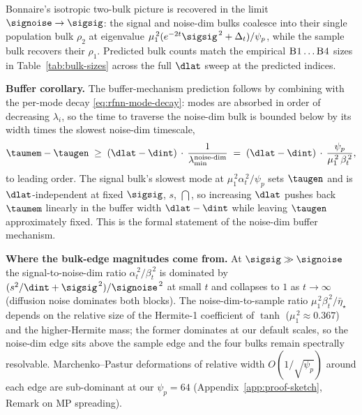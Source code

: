 Bonnaire's isotropic two-bulk picture is recovered in the limit
$\signoise \to \sigsig$: the signal and noise-dim bulks coalesce into
their single population bulk $\rho_2$ at eigenvalue
$\mu_1^{\,2}(e^{-2t}\sigsig^{\,2} + \Delta_t)/\psi_p$, while the
sample bulk recovers their $\rho_1$. Predicted bulk counts match the
empirical $\textsc{B1}\ldots\textsc{B4}$ sizes in
Table~\ref{tab:bulk-sizes} across the full $\dlat$ sweep at the
predicted indices.

\textbf{Buffer corollary.}
The buffer-mechanism prediction follows by combining
 with the per-mode decay
\eqref{eq:rfnn-mode-decay}: modes are absorbed in order of decreasing
$\lambda_i$, so the time to traverse the noise-dim bulk is bounded
below by its width times the slowest noise-dim timescale,
\begin{equation}
  \taumem - \taugen \;\ge\; (\dlat - \dint)\,\cdot\,
    \frac{1}{\lambda_{\min}^{\text{noise-dim}}}
    \;=\; (\dlat - \dint)\,\cdot\,
    \frac{\psi_p}{\mu_1^{\,2}\,\beta_t^{\,2}},
  \label{eq:buffer-bound}
\end{equation}
to leading order. The signal bulk's slowest mode at
$\mu_1^{\,2}\alpha_t^{\,2}/\psi_p$ sets $\taugen$ and is
$\dlat$-independent at fixed $\sigsig$, $s$, $\dint$, so increasing
$\dlat$ pushes back $\taumem$ linearly in the buffer width
$\dlat - \dint$ while leaving $\taugen$ approximately fixed.
This is the formal statement of the noise-dim buffer mechanism.

\textbf{Where the bulk-edge magnitudes come from.}
At $\sigsig \gg \signoise$ the signal-to-noise-dim ratio
$\alpha_t^{\,2}/\beta_t^{\,2}$ is dominated by
$(s^2/\dint + \sigsig^{\,2})/\signoise^{\,2}$ at small $t$ and
collapses to $1$ as $t \to \infty$ (diffusion noise dominates both
blocks). The noise-dim-to-sample ratio
$\mu_1^{\,2}\beta_t^{\,2}/\bar\eta_\star$ depends on the relative
size of the Hermite-1 coefficient of $\tanh$
($\mu_1^{\,2} \approx 0.367$) and the higher-Hermite mass; the
former dominates at our default scales, so the noise-dim edge sits
above the sample edge and the four bulks remain spectrally
resolvable. Marchenko--Pastur deformations of relative width
$O(1/\sqrt{\psi_p})$ around each edge are sub-dominant at our
$\psi_p = 64$ (Appendix~\ref{app:proof-sketch}, Remark on MP
spreading).
